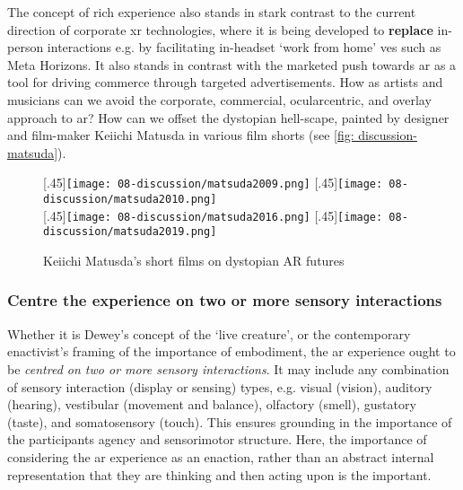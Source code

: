 The concept of rich experience also stands in stark contrast to the current direction of corporate \gls{xr} technologies, where it is being developed to \textbf{replace} in-person interactions e.g. by facilitating in-headset `work from home' \glspl{ve} such as Meta Horizons. It also stands in contrast with the marketed push towards \gls{ar} as a tool for driving commerce through targeted advertisements. How as artists and musicians can we avoid the corporate, commercial, ocularcentric, and overlay approach to \gls{ar}? How can we offset the dystopian hell-scape, painted by designer and film-maker Keiichi Matusda in various film shorts (see \autoref{fig: discussion-matsuda}).

\begin{figure}[hbt]
    \centering
    \captionsetup{justification=centering}
    [.45\linewidth]{\texttt{[image: 08-discussion/matsuda2009.png]}}
    \hfill
    [.45\linewidth]{\texttt{[image: 08-discussion/matsuda2010.png]}} \\
    \vspace{0.5cm}
    [.45\linewidth]{\texttt{[image: 08-discussion/matsuda2016.png]}}
    \hfill
    [.45\linewidth]{\texttt{[image: 08-discussion/matsuda2019.png]}}
    \caption{Keiichi Matusda's short films on dystopian AR futures}
    \label{fig: discussion-matsuda}
\end{figure}

\subsubsection{Centre the experience on two or more sensory interactions}
Whether it is Dewey's concept of the `live creature', or the contemporary enactivist's framing of the importance of embodiment, the \gls{ar} experience ought to be \textit{centred on two or more sensory interactions}. It may include any combination of sensory interaction (display or sensing) types, e.g. visual (vision), auditory (hearing), vestibular (movement and balance), olfactory (smell), gustatory (taste), and somatosensory (touch). This ensures grounding in the importance of the participants agency and sensorimotor structure. Here, the importance of considering the \gls{ar} experience as an enaction, rather than an abstract internal representation that they are thinking and then acting upon is the important.

